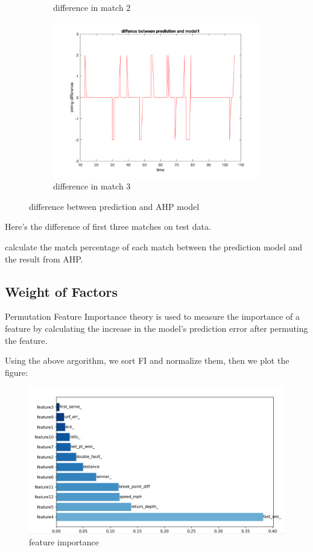 \begin{figure}[H]
\begin{subfigure}[b]{0.34\textwidth}
        \caption{difference in match 2}
    \end{subfigure}\hspace{-0.02\textwidth}
    \begin{subfigure}[b]{0.34\textwidth}
        \includegraphics[width=\linewidth]{mainmatter/imgs/swing_diff_match3_overfit.png}
        \caption{difference in match 3}
    \end{subfigure}
    \caption{difference between prediction and AHP model}
    \label{fig:diff swing}
\end{figure}

Here's the difference of first three matches on test data.

calculate the match percentage of each match between the prediction model and the result from AHP.

\subsection{Weight of Factors}

Permutation Feature Importance theory is used to measure the importance of a feature by calculating 
the increase in the model's prediction error after permuting the feature.

Using the above argorithm, we sort FI and normalize them, then we plot the figure:

\begin{figure}[H]
    \centering
    \includegraphics[scale=0.6]{mainmatter/imgs/8.png}
    \caption{feature importance}
\end{figure}


